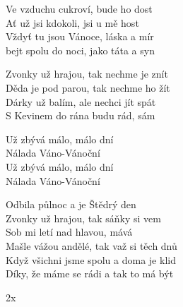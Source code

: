 
\ve{}
Ve vzduchu cukroví, bude ho dost\\
Ať už jsi kdokoli, jsi u mě host\\
Vždyť tu jsou Vánoce, láska a mír\\
bejt spolu do noci, jako táta a syn

\ve{}
Zvonky už hrajou, tak nechme je znít\\
Děda je pod parou, tak nechme ho žít\\
Dárky už balím, ale nechci jít spát\\
S Kevinem do rána budu rád, sám

\cho{}
Už zbývá málo, málo dní\\
Nálada Váno-Vánoční\\
Už zbývá málo, málo dní\\
Nálada Váno-Vánoční

\ve{}
Odbila půlnoc a je Štědrý den\\
Zvonky už hrajou, tak sáňky si vem\\
Sob mi letí nad hlavou, mává \\
Mašle vážou andělé, tak važ si těch dnů\\
Když všichni jsme spolu a doma je klid\\
Díky, že máme se rádi a tak to má být

\cho{}
2x

\esong{}